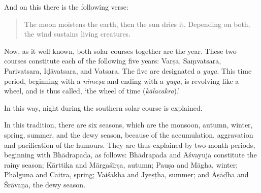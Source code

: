 \begin{translation}
	\item [7]
	And on this there is the following verse:
	\begin{quote}
		The moon moistens the earth, then the sun dries it.  Depending on both, %
		the wind sustains living creatures.
	\end{quote}

	\item [8]
	Now, as it well known, both solar courses %
	together %
	are the year. %
	These two courses %
	constitute %
	each of the following five years: %
	Varṣa, Saṃvatsara, Parivatsara, Iḍāvatsara, and Vatsara. %
	The five are designated %
	a \emph{yuga}. %
	This time period, beginning with a \emph{nimeṣa} and ending with a \emph{yuga}, is revolving like a wheel, and is thus called, `the wheel of time (\emph{kālacakra}).'

	\item [9]
	In this way, night during the southern solar course is explained. %

	\item [10]
	In this tradition, %
	there are six seasons, which are the monsoon, autumn, winter, spring, summer, and the dewy season, because of the accumulation, aggravation and pacification of the humours.
	They are thus explained %
	by two-month periods, %
	beginning with Bhādrapada, %
	as follows: %
	Bhādrapada and Āśvayuja constitute the rainy season; Kārttika and Mārgaśīrṣa, autumn; Pauṣa and Māgha, winter; Phālguna and Caitra, spring; Vaiśākha and Jyeṣṭha, summer; and Āṣāḍha and Śrāvaṇa, the dewy season.


\end{translation}
